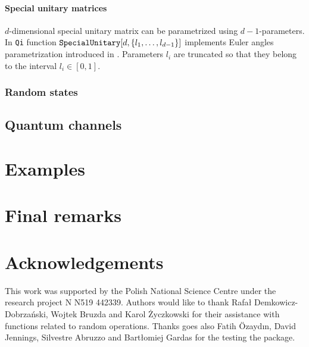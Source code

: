 \documentclass[11pt,a4paper]{article}
\newcommand{\qi}{\texttt{Qi}}
\newcommand{\1}{{\bf 1}}
\newcommand{\fname}[1]{\text{\texttt{#1}}}
\begin{document}
\paragraph{Special unitary matrices}
$d$-dimensional special unitary matrix can be parametrized using
$d-1$-parameters. In \qi{} function
$\fname{SpecialUnitary}[d,\{l_1,\ldots,l_{d-1}\}]$ implements Euler angles
parametrization introduced in \cite{zyczkowski94random}. Parameters $l_i$ are
truncated so that they belong to the interval $l_i\in [0,1]$.
\subsubsection{Random states}

\subsection{Quantum channels}

\section{Examples}

\section{Final remarks}

\section{Acknowledgements}
This work was supported by the Polish National Science Centre under the research
project N N519 442339. Authors would like to thank Rafa{\l}
Demkowicz-Dobrza\'nski, Wojtek Bruzda and Karol \.Zyczkowski for their
assistance with functions related to random operations. Thanks goes also Fatih
\"Ozayd{\i}n, David Jennings, Silvestre Abruzzo and Bart{\l}omiej Gardas for the
testing the package.



\end{document}
